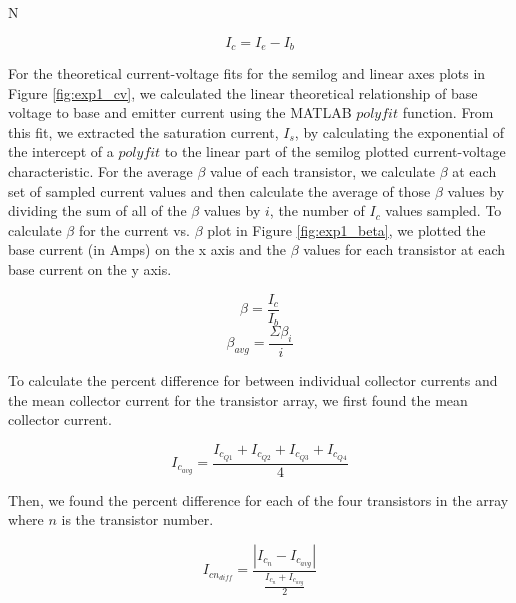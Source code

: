 N\documentclass{article}
\begin{document}
\begin{centering}
    $$I_c = I_e - I_b$$
\end{centering}

For the theoretical current-voltage fits for the semilog and linear axes plots in Figure \ref{fig:exp1_cv}, we calculated the linear theoretical relationship of base voltage to base and emitter current using the MATLAB $polyfit$ function. 
From this fit, we extracted the saturation current, $I_s$, by calculating the exponential of the intercept of a $polyfit$ to the linear part of the semilog plotted current-voltage characteristic. For the average $\beta$ value of each transistor, we calculate $\beta$ at each set of sampled current values and then calculate the average of those $\beta$ values by dividing the sum of all of the $\beta$ values by $i$, the number of $I_c$ values sampled. To calculate $\beta$ for the current vs. $\beta$ plot in Figure \ref{fig:exp1_beta}, we plotted the base current (in Amps) on the x axis and the $\beta$ values for each transistor at each base current on the y axis.

\begin{centering}
    $$\beta = \frac{I_{c}}{I_{b}}$$
    \newline
    $$\beta_{avg} = \frac{\Sigma\beta_{i}}{i}$$
\end{centering}


To calculate the percent difference for between individual collector currents and the mean collector current for the transistor array, we first found the mean collector current.

\begin{centering}
    $$I_{c_{avg}}= \frac{I_{c_{Q1}} + I_{c_{Q2}} + I_{c_{Q3}} + I_{c_{Q4}}}{4} $$
\end{centering}

Then, we found the percent difference for each of the four transistors in the array where $n$ is the transistor number.

\begin{centering}
    $$  I_{cn{_{diff}}} = \frac{|I_{c_n} - I_{c_{avg}}|} {{\frac{I_{c_n} + I_{c_{avg}}}{2}}}$$
\end{centering}
\end{document}
